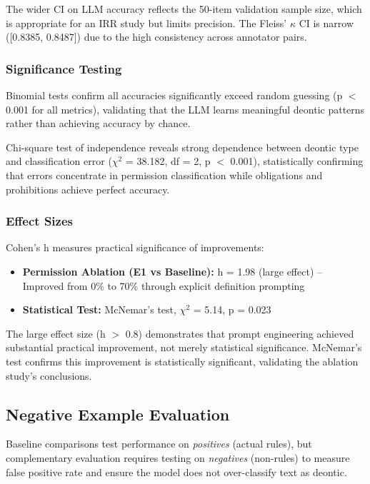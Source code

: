 The wider CI on LLM accuracy reflects the 50-item validation sample size, which is appropriate for an IRR study but limits precision. The Fleiss' $\kappa$ CI is narrow ([0.8385, 0.8487]) due to the high consistency across annotator pairs.

\subsubsection{Significance Testing}

Binomial tests confirm all accuracies significantly exceed random guessing (p $<$ 0.001 for all metrics), validating that the LLM learns meaningful deontic patterns rather than achieving accuracy by chance.

Chi-square test of independence reveals strong dependence between deontic type and classification error ($\chi^2$ = 38.182, df =  2, p $<$ 0.001), statistically confirming that errors concentrate in permission classification while obligations and prohibitions achieve perfect accuracy.

\subsubsection{Effect Sizes}

Cohen's h measures practical significance of improvements:

\begin{itemize}
    \item \textbf{Permission Ablation (E1 vs Baseline):} h = 1.98 (large effect)  
        -- Improved from 0\% to 70\% through explicit definition prompting
    \item \textbf{Statistical Test:} McNemar's test, $\chi^2$ = 5.14, p = 0.023
\end{itemize}

The large effect size (h $>$ 0.8) demonstrates that prompt engineering achieved substantial practical improvement, not merely statistical significance. McNemar's test confirms this improvement is statistically significant, validating the ablation study's conclusions.

\subsection{Negative Example Evaluation}
\label{sec:negative-examples}

Baseline comparisons test performance on \textit{positives} (actual rules), but complementary evaluation requires testing on \textit{negatives} (non-rules) to measure false positive rate and ensure the model does not over-classify text as deontic.

